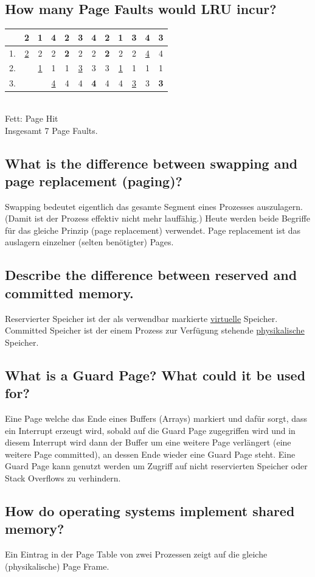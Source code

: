 \subsection{How many Page Faults would LRU incur?}
\begin{tabular}{c|ccccccccccc}
    &2&1&4&2&3&4&2&1&3&4&3\\
  \hline
  1.&\underline{2}&2&2&\textbf{2}&2&2&\textbf{2}&2&2&\underline{4}&4\\
  2.& &\underline{1}&1&1&\underline{3}&3&3&\underline{1}&1&1&1\\
  3.& & &\underline{4}&4&4&\textbf{4}&4&4&\underline{3}&3&\textbf{3}
\end{tabular}
\\
Fett: Page Hit\\
Insgesamt 7 Page Faults.

\subsection{What is the difference between swapping and page replacement (paging)?}
Swapping bedeutet eigentlich das gesamte Segment eines Prozesses auszulagern. (Damit ist der Prozess effektiv nicht mehr lauffähig.)
Heute werden beide Begriffe für das gleiche Prinzip (page replacement) verwendet.
Page replacement ist das auslagern einzelner (selten benötigter) Pages.

\subsection{Describe the difference between reserved and committed memory.\label{ResCom}}
Reservierter Speicher ist der als verwendbar markierte \underline{virtuelle} Speicher.
Committed Speicher ist der einem Prozess zur Verfügung stehende \underline{physikalische} Speicher. 

\subsection{What is a Guard Page? What could it be used for?}
Eine Page welche das Ende eines Buffers (Arrays) markiert und dafür sorgt, dass ein Interrupt erzeugt wird, sobald auf die Guard Page zugegriffen wird und in diesem Interrupt wird dann der Buffer um eine weitere Page verlängert (eine weitere Page committed), an dessen Ende wieder eine Guard Page steht.
Eine Guard Page kann genutzt werden um Zugriff auf nicht reservierten Speicher oder Stack Overflows zu verhindern.

\subsection{How do operating systems implement shared memory?}
Ein Eintrag in der Page Table von zwei Prozessen zeigt auf die gleiche (physikalische) Page Frame.

